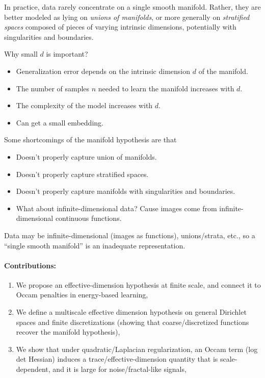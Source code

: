 \documentclass{article}
\begin{document}
In practice, data rarely concentrate on a single smooth manifold. Rather, they are better modeled as lying on \emph{unions of manifolds}, or more generally on \emph{stratified spaces} composed of pieces of varying intrinsic dimensions, potentially with singularities and boundaries.

Why small $d$ is important?
\begin{itemize}
	\item Generalization error depends on the intrinsic dimension $d$ of the manifold.
	\item The number of samples $n$ needed to learn the manifold increases with $d$.
	\item The complexity of the model increases with $d$.
	\item Can get a small embedding.
\end{itemize}

Some shortcomings of the manifold hypothesis are that \begin{itemize}
	\item Doesn't properly capture union of manifolds.
	\item Doesn't properly capture stratified spaces.
	\item Doesn't properly capture manifolds with singularities and boundaries.
	\item What about infinite-dimensional data? Cause images come from infinite-dimensional continuous functions.
\end{itemize}




Data may be infinite-dimensional (images as functions), unions/strata, etc., so a ``single smooth manifold'' is an inadequate representation.

\paragraph{Contributions:}
\begin{enumerate}
	\item We propose an effective-dimension hypothesis at finite scale, and connect it to Occam penalties in energy-based learning,
	\item We define a multiscale effective dimension hypothesis on general Dirichlet spaces and finite discretizations (showing that coarse/discretized functions recover the manifold hypothesis),
	\item We show that under quadratic/Laplacian regularization, an Occam term (log det Hessian) induces a trace/effective-dimension quantity that is scale-dependent, and it is large for noise/fractal-like signals,
\end{enumerate}
\end{document}
